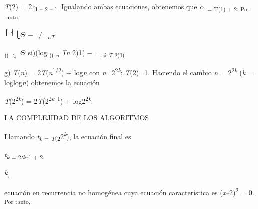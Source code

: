 \documentclass[12pt]{article}
\renewcommand{\_}{\kern-1.5pt\textunderscore\kern-1.5pt}
\begin{document}
\begin{Center}
{\fontsize{10pt}{12.0pt}\selectfont \textit{T}(2) = 2\textit{c}\textsubscript{1 – 2 – 1. }Igualando ambas ecuaciones, obtenemos que \textit{c}\textsubscript{1 = T(1) + 2. Por tanto, }\par}
\end{Center}\par

\begin{FlushRight}
\textsuperscript{⎧ ⎨}⎩$ \Theta $  $-$ $ \neq $  \textit{\textsubscript{nT }}
\end{FlushRight}\par

\begin{Center}
\textsubscript{)( $ \in $  }$ \Theta $  si)(log \textsubscript{)( \textit{n }}\textit{Tn }2)1( $-$ = \textsubscript{si \textit{T }2)1( }{\fontsize{10pt}{12.0pt}\selectfont g) \textit{T}(\textit{n}) = 2\textit{T}(\textit{n}\textsuperscript{1/2}) + log\textit{n }con \textit{n}=2\textsuperscript{2\textit{k}}; \textit{T}(2)=1. Haciendo el cambio \textit{n }= 2\textsuperscript{2\textit{k }}(\textit{k }= loglog\textit{n}) obtenemos la ecuación \par}
\end{Center}\par

{\fontsize{10pt}{12.0pt}\selectfont \textit{T}(2\textsuperscript{2\textit{k}}) = 2\textit{T}(2\textsuperscript{2\textit{k}–1}) + log2\textsuperscript{2\textit{k}}. \par}\par

{\fontsize{7pt}{8.4pt}\selectfont LA COMPLEJIDAD DE LOS ALGORITMOS {\fontsize{10pt}{12.0pt} \par}\par}\par

{\fontsize{10pt}{12.0pt}\selectfont Llamando \textit{t\textsubscript{k }}\textsubscript{= \textit{T}(2}2\textit{\textsuperscript{k}}), la ecuación final es \par}\par

\begin{Center}
{\fontsize{10pt}{12.0pt}\selectfont \textit{t\textsubscript{k }}\textsubscript{= 2\textit{tk}–1 + 2}{\fontsize{7pt}{8.4pt}\selectfont \textit{k}\textsubscript{, }{\fontsize{10pt}{12.0pt}\selectfont ecuación en recurrencia no homogénea cuya ecuación característica es (\textit{x}–2)\textsuperscript{2 }= 0. \textsubscript{Por tanto, }\par}\par}\par}
\end{Center}\par
\end{document}
